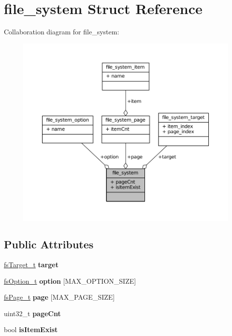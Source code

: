 \hypertarget{structfile__system}{}\section{file\+\_\+system Struct Reference}
\label{structfile__system}


Collaboration diagram for file\+\_\+system\+:\nopagebreak
\begin{figure}[H]
\begin{center}
\leavevmode
\includegraphics[width=350pt]{structfile__system__coll__graph}
\end{center}
\end{figure}
\subsection*{Public Attributes}
\begin{DoxyCompactItemize}
\item 
\mbox{\label{structfile__system_a3005342bfc17d44a4ec20a1c813f11aa}} 
\hyperlink{structfile__system__target}{fs\+Target\+\_\+t} {\bfseries target}
\item 
\mbox{\label{structfile__system_a05547e7cf3ccbc9617617f64ac5d846c}} 
\hyperlink{structfile__system__option}{fs\+Option\+\_\+t} {\bfseries option} \mbox{[}M\+A\+X\+\_\+\+O\+P\+T\+I\+O\+N\+\_\+\+S\+I\+ZE\mbox{]}
\item 
\mbox{\label{structfile__system_a2df47dc597b0bb15cf05b01cccd672e0}} 
\hyperlink{structfile__system__page}{fs\+Page\+\_\+t} {\bfseries page} \mbox{[}M\+A\+X\+\_\+\+P\+A\+G\+E\+\_\+\+S\+I\+ZE\mbox{]}
\item 
\mbox{\label{structfile__system_a0cca058988e712a79cd3af1fb0017a26}} 
uint32\+\_\+t {\bfseries page\+Cnt}
\item 
\mbox{\label{structfile__system_ac9bc629527ceea4aff65fbc580704b66}} 
bool {\bfseries is\+Item\+Exist}
\end{DoxyCompactItemize}


